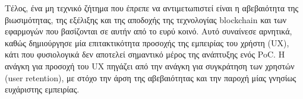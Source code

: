 Τέλος, ένα μη τεχνικό ζήτημα που έπρεπε να αντιμετωπιστεί είναι η αβεβαιότητα της βιωσιμότητας, της εξέλιξης και της αποδοχής της τεχνολογίας blockchain και των εφαρμογών που βασίζονται σε αυτήν από το ευρύ κοινό. Αυτό συναίνεσε αρνητικά, καθώς δημιούργησε μία επιτακτικότητα προσοχής της εμπειρίας του χρήστη (UX), κάτι που φυσιολογικά δεν αποτελεί σημαντικό μέρος της ανάπτυξης ενός PoC. Η ανάγκη για προσοχή του UX πηγάζει από την ανάγκη για συγκράτηση των χρηστών (user retention), με στόχο την άρση της αβεβαιότητας και την παροχή μίας γνησίως ευχάριστης εμπειρίας.
